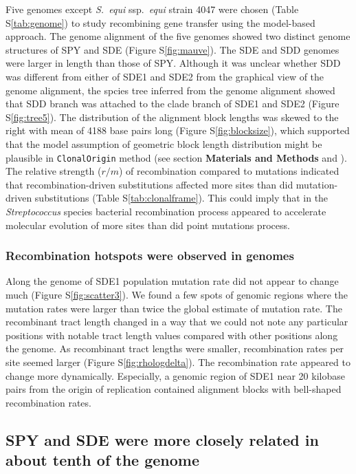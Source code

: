 \documentclass[english]{article}
\begin{document}
Five genomes except \textit{S.\ equi} ssp.\textit{\ equi} strain 4047 were
chosen (Table S\ref{tab:genome}) to study recombining gene transfer using the
model-based approach.  The genome alignment of the five genomes showed two
distinct genome structures of SPY and SDE (Figure S\ref{fig:mauve}). The SDE and
SDD genomes were larger in length than those of SPY. Although it was unclear
whether SDD was different from either of SDE1 and SDE2 from the graphical view
of the genome alignment, the spcies tree inferred from the genome alignment
showed that SDD branch was attached to the clade branch of SDE1 and SDE2 (Figure
S\ref{fig:tree5}). The distribution of the alignment block lengths was skewed to
the right with mean of 4188 base pairs long (Figure S\ref{fig:blocksize}), which
supported that the model assumption of geometric block length distribution might
be plausible in \texttt{ClonalOrigin} method (see section \textbf{Materials and
Methods} and \citealt{Didelot2010}).  The relative strength ($r/m$) of
recombination compared to mutations indicated that recombination-driven
substitutions affected more sites than did mutation-driven substitutions (Table
S\ref{tab:clonalframe}). This could imply that in the \textit{Streptococcus}
species bacterial recombination process appeared to accelerate molecular
evolution of more sites than did point mutations process.

\subsubsection{Recombination hotspots were observed in genomes}

Along the genome of SDE1 population mutation rate did not appear to change much
(Figure S\ref{fig:scatter3}).  We found a few spots of genomic regions where the
mutation rates were larger than twice the global estimate of mutation rate.  The
recombinant tract length changed in a way that we could not note any particular
positions with notable tract length values compared with other positions along
the genome.  As recombinant tract lengths were smaller, recombination rates per
site seemed larger (Figure S\ref{fig:rhologdelta}).  The recombination rate
appeared to change more dynamically. Especially, a genomic region of SDE1 near
20 kilobase pairs from the origin of replication contained alignment blocks with
bell-shaped recombination rates.  

\subsection{SPY and SDE were more closely related in about tenth of the genome}
\end{document}
